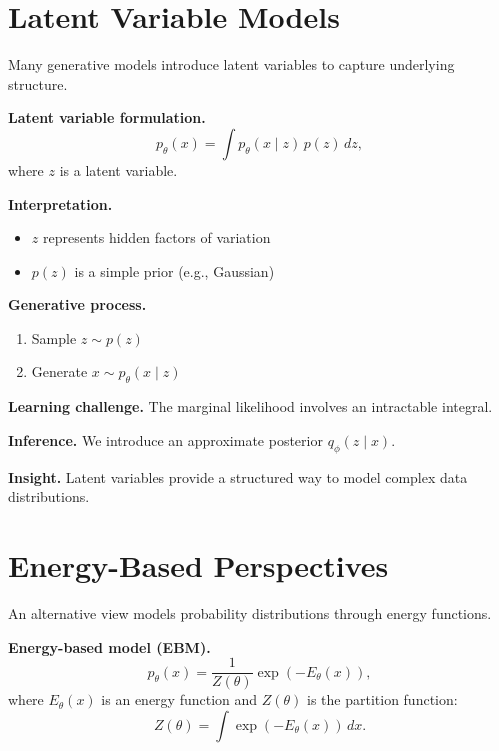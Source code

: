 \section{Latent Variable Models}

Many generative models introduce latent variables to capture underlying structure.

\medskip

\noindent
\textbf{Latent variable formulation.}
\[
p_\theta(x) = \int p_\theta(x \mid z) \, p(z) \, dz,
\]
where $z$ is a latent variable.

\medskip

\noindent
\textbf{Interpretation.}
\begin{itemize}
    \item $z$ represents hidden factors of variation
    \item $p(z)$ is a simple prior (e.g., Gaussian)
\end{itemize}

\medskip

\noindent
\textbf{Generative process.}
\begin{enumerate}
    \item Sample $z \sim p(z)$
    \item Generate $x \sim p_\theta(x \mid z)$
\end{enumerate}

\medskip

\noindent
\textbf{Learning challenge.}  
The marginal likelihood involves an intractable integral.

\medskip

\noindent
\textbf{Inference.}  
We introduce an approximate posterior $q_\phi(z \mid x)$.

\medskip

\noindent
\textbf{Insight.}  
Latent variables provide a structured way to model complex data distributions.

\section{Energy-Based Perspectives}

An alternative view models probability distributions through energy functions.

\medskip

\noindent
\textbf{Energy-based model (EBM).}
\[
p_\theta(x) = \frac{1}{Z(\theta)} \exp(-E_\theta(x)),
\]
where $E_\theta(x)$ is an energy function and $Z(\theta)$ is the partition function:
\[
Z(\theta) = \int \exp(-E_\theta(x)) \, dx.
\]

